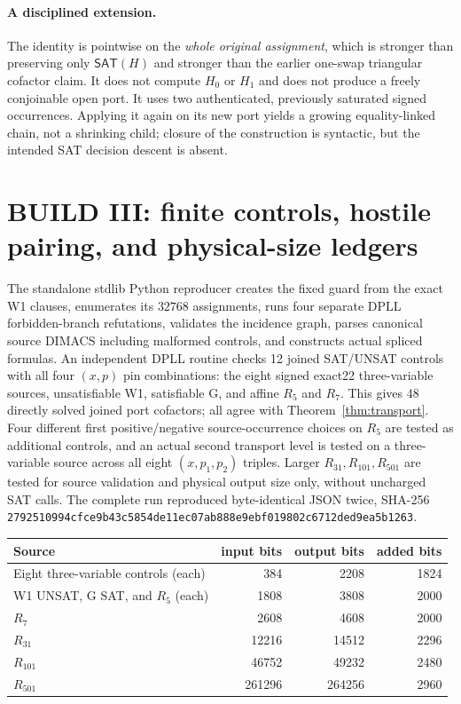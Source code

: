 \documentclass[11pt]{article}
\newcommand{\sat}{\mathsf{SAT}}
\begin{document}
\paragraph{A disciplined extension.} The identity is pointwise on the \emph{whole original assignment}, which is stronger than preserving only $\sat(H)$ and stronger than the earlier one-swap triangular cofactor claim. It does not compute $H_0$ or $H_1$ and does not produce a freely conjoinable open port. It uses two authenticated, previously saturated signed occurrences. Applying it again on its new port yields a growing equality-linked chain, not a shrinking child; closure of the construction is syntactic, but the intended SAT decision descent is absent.

\section{BUILD III: finite controls, hostile pairing, and physical-size ledgers}
The standalone stdlib Python reproducer creates the fixed guard from the exact W1 clauses, enumerates its $32768$ assignments, runs four separate DPLL forbidden-branch refutations, validates the incidence graph, parses canonical source DIMACS including malformed controls, and constructs actual spliced formulas. An independent DPLL routine checks 12 joined SAT/UNSAT controls with all four $(x,p)$ pin combinations: the eight signed exact22 three-variable sources, unsatisfiable W1, satisfiable G, and affine $R_5$ and $R_7$. This gives 48 directly solved joined port cofactors; all agree with Theorem~\ref{thm:transport}. Four different first positive/negative source-occurrence choices on $R_5$ are tested as additional controls, and an actual second transport level is tested on a three-variable source across all eight $(x,p_1,p_2)$ triples. Larger $R_{31},R_{101},R_{501}$ are tested for source validation and physical output size only, without uncharged SAT calls. The complete run reproduced byte-identical JSON twice, SHA-256 \texttt{2792510994cfce9b43c5854de11ec07ab888e9ebf019802c6712ded9ea5b1263}.

\begin{center}\begin{tabular}{lrrr}\toprule
Source & input bits & output bits & added bits\\\midrule
Eight three-variable controls (each)&384&2208&1824\\
W1 UNSAT, G SAT, and $R_5$ (each)&1808&3808&2000\\
$R_7$&2608&4608&2000\\
$R_{31}$&12216&14512&2296\\
$R_{101}$&46752&49232&2480\\
$R_{501}$&261296&264256&2960\\\bottomrule\end{tabular}\end{center}
\end{document}
